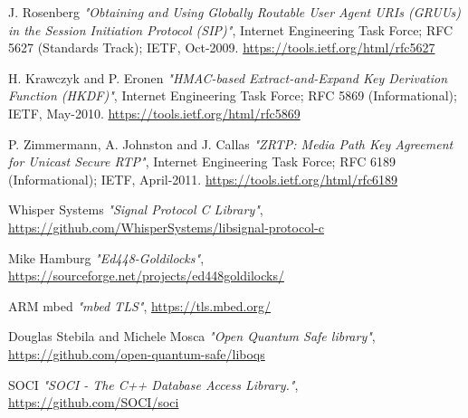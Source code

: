 \documentclass[a4paper,11pt]{article}
\begin{document}
\begin{thebibliography}{99}
  J. Rosenberg
  \textit{\:"Obtaining and Using Globally Routable User Agent URIs (GRUUs) in the Session Initiation Protocol (SIP)"},
  Internet Engineering Task Force; RFC 5627 (Standards Track); IETF, Oct-2009.
  \href{https://tools.ietf.org/html/rfc5627}{https://tools.ietf.org/html/rfc5627}

  H. Krawczyk and P. Eronen
  \textit{\:"HMAC-based Extract-and-Expand Key Derivation Function (HKDF)"},
  Internet Engineering Task Force; RFC 5869 (Informational); IETF, May-2010.
  \href{https://tools.ietf.org/html/rfc5869}{https://tools.ietf.org/html/rfc5869}

  P. Zimmermann, A. Johnston and J. Callas
  \textit{\:"ZRTP: Media Path Key Agreement for Unicast Secure RTP"},
  Internet Engineering Task Force; RFC 6189 (Informational); IETF, April-2011.
  \href{https://tools.ietf.org/html/rfc6189}{https://tools.ietf.org/html/rfc6189}

  Whisper Systems
  \textit{\:"Signal Protocol C Library"},
  \href{https://github.com/WhisperSystems/libsignal-protocol-c}{https://github.com/WhisperSystems/libsignal-protocol-c}

  Mike Hamburg
  \textit{\:"Ed448-Goldilocks"},
  \href{https://sourceforge.net/projects/ed448goldilocks/}{https://sourceforge.net/projects/ed448goldilocks/}

  ARM mbed
  \textit{\:"mbed TLS"},
  \href{https://tls.mbed.org/}{https://tls.mbed.org/}

  Douglas Stebila and Michele Mosca
  \textit{\:"Open Quantum Safe library"},
  \href{https://github.com/open-quantum-safe/liboqs}{https://github.com/open-quantum-safe/liboqs}

  SOCI
  \textit{\:"SOCI - The C++ Database Access Library."},
  \href{https://github.com/SOCI/soci}{https://github.com/SOCI/soci}
\end{thebibliography}
\end{document}
